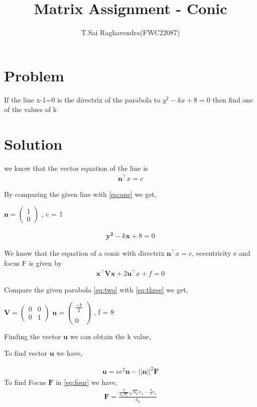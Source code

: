 \documentclass[journal,12pt,twocolumn]{IEEEtran}
\title{\mytitle}
\title{
Matrix Assignment - Conic
}
\author{T.Sai Raghavendra(FWC22087)}
\newcommand{\myvec}[1]{\ensuremath{\begin{pmatrix}#1\end{pmatrix}}}
\let\vec\mathbf
\begin{document}
\maketitle
\tableofcontents
\bigskip


\section{Problem}
If the line x-1=0 is the directrix of the parabola to $y^2-kx+8=0$ then find one of the values of k


\section{Solution}

we know that the vector equation of the line is 
\begin{align}
\label{eq:one}
\vec{n}^\top x = c
\end{align}

By comparing the given line with \eqref{eq:one} we get, 

\begin{center}
$\vec{n} = \myvec{1\\0}$ , c = 1 
\end{center}

\begin{align}
\label{eq:two}
\vec{y^2}-k\vec{x}+8=0 
\end{align}

We know that the equation of a conic with directrix $\vec{n}^\top x = c$, eccentricity e and focus F is given by 
\begin{align}
\label{eq:three}
\vec{x^\top Vx}+2\vec{u^\top}x+f = 0 
\end{align}


Compare the given parabola \eqref{eq:two} with \eqref{eq:three} we get,
\begin{center}
$\vec{V} = \myvec{0&0\\0&1}$ $\vec{u} = \myvec{\frac{-k}{2} \\ \\ 0}$ , f = 8
\end{center}

Finding the vector $\vec{u}$ we can obtain the k value, 

To find vector $\vec{u}$ we have,

\begin{align}
\label{eq:four}
\vec{u}=ce^2\vec{n}-||\vec{n}||^2\vec{F}
\end{align}
To find Focus $\vec{F}$ in \eqref{eq:four} we have,
\begin{align}
\label{eq:five}
\vec{F} = \frac{\frac{\eta}{4\sqrt{\lambda_2}}\sqrt{\lambda_2}e_1 - \frac{\eta}{2}e_1}{\lambda_2}
\end{align}
\end{document}
